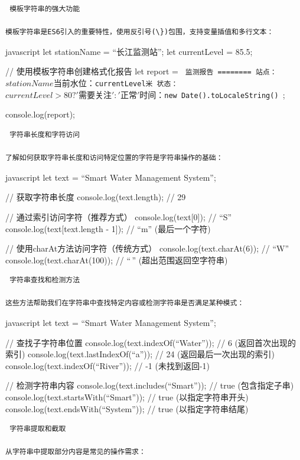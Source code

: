 \begin{lstlisting}
 模板字符串的强大功能

模板字符串是ES6引入的重要特性，使用反引号(\})包围，支持变量插值和多行文本：
\end{lstlisting}

javascript let stationName = ``长江监测站''; let currentLevel = 85.5;

// 使用模板字符串创建格式化报告 let report = \texttt{
监测报告
========
站点：${stationName}
当前水位：${currentLevel}米
状态：${currentLevel > 80 ? '需要关注' : '正常'}
时间：${new Date().toLocaleString()}
};

console.log(report);

\begin{lstlisting}
 字符串长度和字符访问

了解如何获取字符串长度和访问特定位置的字符是字符串操作的基础：
\end{lstlisting}

javascript let text = ``Smart Water Management System'';

// 获取字符串长度 console.log(text.length); // 29

// 通过索引访问字符（推荐方式） console.log(text{[}0{]}); // ``S'' console.log(text{[}text.length - 1{]}); // ``m'' (最后一个字符)

// 使用charAt方法访问字符（传统方式） console.log(text.charAt(6)); // ``W'' console.log(text.charAt(100)); // ``\,'' (超出范围返回空字符串)

\begin{lstlisting}
 字符串查找和检测方法

这些方法帮助我们在字符串中查找特定内容或检测字符串是否满足某种模式：
\end{lstlisting}

javascript let text = ``Smart Water Management System'';

// 查找子字符串位置 console.log(text.indexOf(``Water'')); // 6 (返回首次出现的索引) console.log(text.lastIndexOf(``a'')); // 24 (返回最后一次出现的索引) console.log(text.indexOf(``River'')); // -1 (未找到返回-1)

// 检测字符串内容 console.log(text.includes(``Smart'')); // true (包含指定子串) console.log(text.startsWith(``Smart'')); // true (以指定字符串开头) console.log(text.endsWith(``System'')); // true (以指定字符串结尾)

\begin{lstlisting}
 字符串提取和截取

从字符串中提取部分内容是常见的操作需求：
\end{lstlisting}

